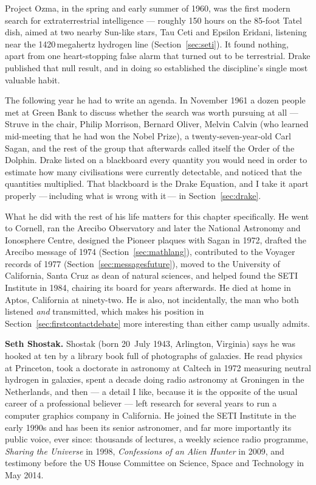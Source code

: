 Project Ozma, in the spring and early summer of 1960, was the first modern search for
extraterrestrial intelligence --- roughly 150 hours on the 85-foot Tatel dish, aimed at two nearby
Sun-like stars, Tau Ceti and Epsilon Eridani, listening near the 1420\,megahertz hydrogen line
(Section~\ref{sec:seti}). It found nothing, apart from one heart-stopping false alarm that turned out
to be terrestrial. Drake published that null result, and in doing so established the discipline's
single most valuable habit.

The following year he had to write an agenda. In November 1961 a dozen people met at Green Bank to
discuss whether the search was worth pursuing at all --- Struve in the chair, Philip Morrison,
Bernard Oliver, Melvin Calvin (who learned mid-meeting that he had won the Nobel Prize), a
twenty-seven-year-old Carl Sagan, and the rest of the group that afterwards called itself the Order
of the Dolphin. Drake listed on a blackboard every quantity you would need in order to estimate how
many civilisations were currently detectable, and noticed that the quantities multiplied. That
blackboard is the Drake Equation, and I take it apart properly ---\,including what is wrong with
it\,--- in Section~\ref{sec:drake}.

What he did with the rest of his life matters for this chapter specifically. He went to Cornell,
ran the Arecibo Observatory and later the National Astronomy and Ionosphere Centre, designed the
Pioneer plaques with Sagan in 1972, drafted the Arecibo message of 1974 (Section~\ref{sec:mathlang}),
contributed to the Voyager records of 1977 (Section~\ref{sec:messagesfuture}), moved to the
University of California, Santa Cruz as dean of natural sciences, and helped found the SETI Institute
in 1984, chairing its board for years afterwards. He died at home in Aptos, California at
ninety-two.  He is also,
not incidentally, the man who both listened \emph{and} transmitted, which makes his position in
Section~\ref{sec:firstcontactdebate} more interesting than either camp usually admits.

\medskip\noindent\textbf{Seth Shostak.}
Shostak (born 20~July 1943, Arlington, Virginia) says he was hooked at ten by a library book full
of photographs of galaxies. He read physics at Princeton, took a doctorate in astronomy at Caltech in
1972 measuring neutral hydrogen in galaxies, spent a decade doing radio astronomy at Groningen in the
Netherlands, and then --- a detail I like, because it is the opposite of the usual career of a
professional believer --- left research for several years to run a computer graphics company in
California. He joined the SETI Institute in the early 1990s and has been its senior astronomer, and
far more importantly its public voice, ever since: thousands of lectures, a weekly science radio
programme, \emph{Sharing the Universe} in 1998, \emph{Confessions of an Alien Hunter} in 2009,
and testimony before the US House Committee on Science, Space and Technology in May 2014.

